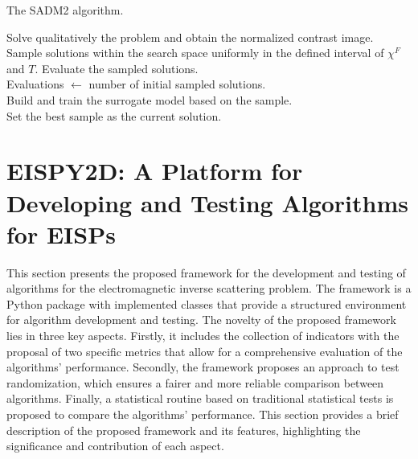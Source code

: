 				\begin{algorithm}[!h]
					\caption[Explanation of the functioning of the SADM2 algorithm.]{The SADM2 algorithm.}
					\label{alg:sadm2}
					Solve qualitatively the problem and obtain the normalized contrast image.\\
					Sample solutions within the search space uniformly in the defined interval of $\chi^F$ and $T$.
					Evaluate the sampled solutions.\\
					Evaluations $\leftarrow$ number of initial sampled solutions.\\
					Build and train the surrogate model based on the sample.\\
					Set the best sample as the current solution.\\
				\end{algorithm}
	
	\section{EISPY2D: A Platform for Developing and Testing Algorithms for EISPs}\label{chap:proposed-methodology:library}
		
		This section presents the proposed framework for the development and testing of algorithms for the electromagnetic inverse scattering problem. The framework is a Python package with implemented classes that provide a structured environment for algorithm development and testing. The novelty of the proposed framework lies in three key aspects. Firstly, it includes the collection of indicators with the proposal of two specific metrics that allow for a comprehensive evaluation of the algorithms' performance. Secondly, the framework proposes an approach to test randomization, which ensures a fairer and more reliable comparison between algorithms. Finally, a statistical routine based on traditional statistical tests is proposed to compare the algorithms' performance. This section provides a brief description of the proposed framework and its features, highlighting the significance and contribution of each aspect.
		
